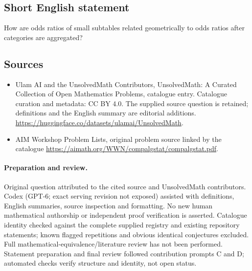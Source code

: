 \documentclass[11pt]{article}
\begin{document}
\subsection{Short English statement}
How are odds ratios of small subtables related geometrically to odds ratios after categories are aggregated?
\subsection{Sources}
\begin{itemize}
\item[\hypertarget{source:statement:1}{S1}] Ulam AI and the UnsolvedMath Contributors, UnsolvedMath: A Curated Collection of Open Mathematics Problems, catalogue entry. Catalogue curation and metadata: CC BY 4.0. The supplied source question is retained; definitions and the English summary are editorial additions.
\url{https://huggingface.co/datasets/ulamai/UnsolvedMath}.
\item[\hypertarget{source:statement:2}{S2}] AIM Workshop Problem Lists, original problem source linked by the catalogue
\url{https://aimath.org/WWN/compalgstat/compalgstat.pdf}.
\end{itemize}
\paragraph{Preparation and review.}
Original question attributed to the cited source and UnsolvedMath contributors. Codex (GPT-6; exact serving revision not exposed) assisted with definitions, English summaries, source inspection and formatting. No new human mathematical authorship or independent proof verification is asserted. Catalogue identity checked against the complete supplied registry and existing repository statements; known flagged repetitions and obvious identical conjectures excluded. Full mathematical-equivalence/literature review has not been performed. Statement preparation and final review followed contribution prompts C and D; automated checks verify structure and identity, not open status.
\label{end:statement}
\end{document}
